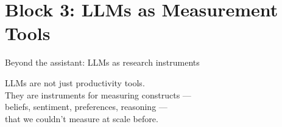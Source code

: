 \documentclass[aspectratio=169, 10pt]{beamer}
\begin{document}
\section{Block 3: LLMs as Measurement Tools}

\begin{frame}{Beyond the assistant: LLMs as research instruments}
  \begin{center}
    {\large LLMs are not just productivity tools.}\\[0.4em]
    {\large They are instruments for \alert{measuring constructs} ---}\\[0.2em]
    {\large beliefs, sentiment, preferences, reasoning ---}\\[0.2em]
    {\large that we couldn't measure at scale before.}
  \end{center}
\end{frame}
\end{document}
